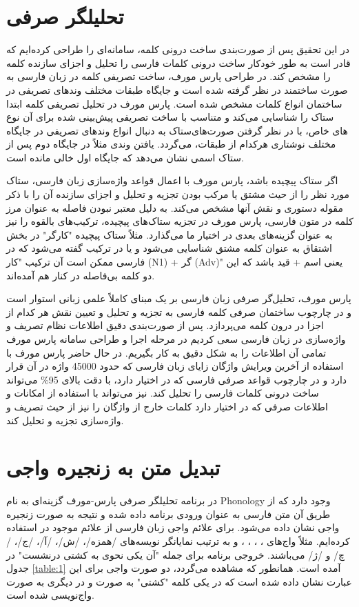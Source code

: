 \documentclass[12pt,onecolumn,a4paper]{article}
\begin{document}
    \section{تحلیلگر صرفی}
    در این تحقیق پس از صورت‌بندی ساخت درونی کلمه، سامانه‌ای را طراحی کرده‌ایم که قادر است به طور خودکار ساخت درونی کلمات فارسی را تحلیل و اجزای سازنده کلمه را مشخص کند. در طراحی پارس مورف، ساخت تصریفی کلمه در زبان فارسی {\mfo\citep{eslami_88}} به صورت ساختمند در نظر گرفته شده است و جایگاه طبقات مختلف وندهای تصریفی در ساختمان انواع کلمات مشخص شده است. پارس مورف در تحلیل تصریفی کلمه ابتدا ستاک را شناسایی می‌کند و متناسب با ساخت تصریفی پیش‌بینی شده برای آن نوع ستاک به دنبال انواع وندهای تصریفی در جایگاه‎‌های خاص، با در نظر گرفتن صورت‌های مختلف نوشتاری هرکدام از طبقات، می‌گردد. یافتن وندی مثلاً در جایگاه دوم پس از ستاک اسمی نشان می‌دهد که جایگاه اول خالی مانده است.
    \par
    اگر ستاک پیچیده باشد، پارس مورف با اعمال قواعد واژه‌سازی زبان فارسی، ستاک مورد نظر را از حیث مشتق یا مرکب بودن تجزیه و تحلیل و اجزای سازنده آن را با ذکر مقوله دستوری و نقش آنها مشخص می‌کند. به دلیل معتبر نبودن فاصله به عنوان مرز کلمه در متون فارسی، پارس مورف در تجزیه ستاک‌های پیچیده، ترکیب‌های بالقوه را نیز به عنوان گزینه‌های بعدی در اختیار ما می‌گذارد. مثلاً ستاک پیچیده "کارگر" در بخش اشتقاق به عنوان کلمه مشتق شناسایی می‌شود و یا در ترکیب گفته می‌شود که در فارسی ممکن است آن ترکیب "کار (N1) + گر (Adv)" یعنی اسم + قید باشد که این دو کلمه بی‌فاصله در کنار هم آمده‌اند.
    \par
    پارس مورف، تحلیل‌گر صرفی زبان فارسی بر یک مبنای کاملاً علمی زبانی استوار است و در چارچوب ساختمان صرفی کلمه فارسی به تجزیه و تحلیل و تعیین نقش هر کدام از اجزا در درون کلمه می‌پردازد. پس از صورت‌بندی دقیق اطلاعات نظام تصریف و واژه‌سازی در زبان فارسی سعی کردیم در مرحله اجرا و طراحی سامانه پارس مورف تمامی آن اطلاعات را به شکل دقیق به کار بگیریم. در حال حاضر پارس مورف با استفاده از آخرین ویرایش واژگان زایای زبان فارسی {\mfo\citep{eslami_83b}} که حدود 45000 واژه در آن قرار دارد و در چارچوب قواعد صرفی فارسی که در اختیار دارد، با دقت بالای 95\% می‌تواند ساخت درونی کلمات فارسی را تحلیل کند. نیز می‌تواند با استفاده از امکانات و اطلاعات صرفی که در اختیار دارد کلمات خارج از واژگان را نیز از حیث تصریف و واژه‌سازی تجزیه و تحلیل کند.

    \section{تبدیل متن به زنجیره واجی}
    در برنامه تحلیلگر صرفی پارس-مورف گزینه‌ای به نام Phonology وجود دارد که از طریق آن متن فارسی به عنوان ورودی برنامه داده شده و نتیجه به صورت زنجیره واجی نشان داده می‌شود. برای علائم واجی زبان فارسی از علائم موجود در {\mfo\citep{samareh_78}} استفاده کرده‌ایم. مثلاً واج‌های  ، ، ،  ،  و  به ترتیب نمایانگر نویسه‌های /همزه/، /ش/، /آ/، /ج/، /چ/ و /ژ/ می‌باشند.
    خروجی برنامه برای جمله "آن یکی نحوی به کشتی درنشست" در جدول \ref{table:1} آمده است. همانطور که مشاهده می‌گردد، دو صورت واجی برای این عبارت نشان داده شده است که در یکی کلمه "کشتی" به صورت  و در دیگری به صورت  واج‌نویسی شده است.
\end{document}
